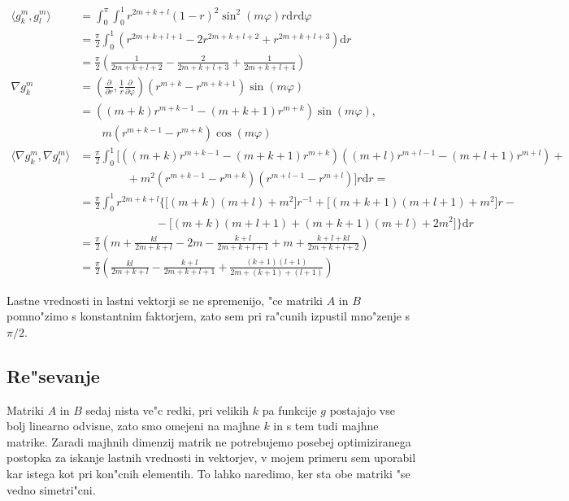 \documentclass[a4paper,10pt]{article}
\renewcommand{\phi}{\varphi}
\newcommand{\dd}{\mathrm{d}}
\newcommand{\parcialno}[2]{
  \frac{\partial #1}{\partial #2}
}
\begin{document}
\begin{align}
\langle g_{k}^{m}, g_{l}^{m} \rangle &= \int_0^\pi \int_0^1 r^{2m+k+l}(1-r)^2 \sin^2 (m\phi) r \dd r \dd \phi \nonumber \\
  &= \frac{\pi}{2} \int_0^1 \left( r^{2m+k+l+1} -2r^{2m+k+l+2} + r^{2m+k+l+3} \right) \dd r \nonumber \\
  &= \frac{\pi}{2} \left( \frac{1}{2m+k+l+2} - \frac{2}{2m+k+l+3} + \frac{1}{2m+k+l+4} \right) \\
  \nabla g_{k}^{m} &= \left( \parcialno{}{r}, \frac{1}{r} \parcialno{}{\phi} \right) \left( r^{m+k} - r^{m+k+1}\right) \sin(m\phi) \nonumber \\
  &= \left((m+k)r^{m+k-1} - (m+k+1)r^{m+k} \right)\sin(m\phi), \nonumber \\
  & {} \quad \quad m\left( r^{m+k-1} - r^{m+k}\right) \cos(m\phi) \\
  \langle \nabla g_{k}^{m}, \nabla g_{l}^{m} \rangle &= \frac{\pi}{2} \int_0^1 \Big[ \left((m+k)r^{m+k-1} - (m+k+1)r^{m+k} \right)\left((m+l)r^{m+l-1} - (m+l+1)r^{m+l} \right) + \nonumber \\
  & {} \hspace{50pt} + m^2 \left( r^{m+k-1} - r^{m+k}\right)\left( r^{m+l-1} - r^{m+l}\right) \Big] r \dd r = \nonumber \\
  &= \frac{\pi}{2} \int_0^1 r^{2m+k+l} \Big\{ \big[ (m+k)(m+l) + m^2 \big] r^{-1} + \big[ (m+k+1)(m+l+1) + m^2 \big]r - \nonumber \\ 
  & \hspace{80pt} - \big[ (m+k)(m+l+1) + (m+k+1)(m+l) + 2m^2 \big] \Big\} \dd r \nonumber \\
  &= \frac{\pi}{2} \left( m + \frac{kl}{2m+k+l} -2m - \frac{k + l}{2m+k+l+1} + m + \frac{k+l + kl}{2m+k+l+2} \right) \nonumber \\
  &= \frac{\pi}{2} \left( \frac{kl}{2m+k+l} - \frac{k + l}{2m+k+l+1} + \frac{(k+1)(l+1)}{2m+(k+1)+(l+1)} \right)
\end{align}

Lastne vrednosti in lastni vektorji se ne spremenijo, "ce matriki $A$ in $B$ pomno"zimo s konstantnim faktorjem, zato sem pri ra"cunih izpustil mno"zenje s $\pi/2$. 

\subsection{Re"sevanje}

Matriki $A$ in $B$ sedaj nista ve"c redki, pri velikih $k$ pa funkcije $g$ postajajo vse bolj linearno odvisne, zato smo omejeni na majhne $k$ in s tem tudi majhne matrike. Zaradi majhnih dimenzij matrik ne potrebujemo posebej optimiziranega postopka za iskanje lastnih vrednosti in vektorjev, v mojem primeru sem uporabil kar istega kot pri kon"cnih elementih. To lahko naredimo, ker sta obe matriki "se vedno simetri"cni. 
\end{document}
